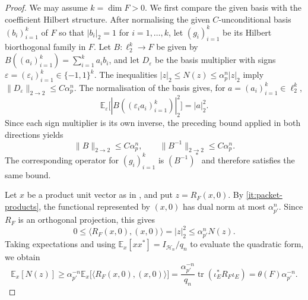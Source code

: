 \documentclass[11pt,a4paper,reqno]{amsart}
\theoremstyle{definition}
\newcommand{\eps}{\varepsilon}
\newcommand{\norm}[1]{\lVert #1\rVert}
\DeclareMathOperator{\tr}{tr}
\numberwithin{equation}{section}
\begin{document}
\begin{proof}
We may assume $k=\dim F>0$. We first compare the given basis with the coefficient Hilbert structure. After normalising the given $C$-unconditional basis $(b_i)_{i=1}^k$ of $F$ so that $|b_i|_2=1$ for $i=1,\ldots,k$, let $(g_i)_{i=1}^k$ be its Hilbert biorthogonal family in $F$. Let $B\colon\ell_2^k\to F$ be given by $B((a_i)_{i=1}^k)=\sum_{i=1}^k a_i b_i$, and let $D_\eps$ be the basis multiplier with signs $\eps=(\eps_i)_{i=1}^k\in\{-1,1\}^k$. The inequalities $|z|_2\leq N(z)\leq \alpha_p^n|z|_2$ imply $\norm{D_\eps}_{2\to2}\leq C\alpha_p^n$. The normalisation of the basis gives, for $a=(a_i)_{i=1}^k\in\ell_2^k$,
\begin{equation*}
 \mathbb E_\eps\bigl[|B((\eps_i a_i)_{i=1}^k)|_2^2\bigr]=|a|_2^2.
\end{equation*}
Since each sign multiplier is its own inverse, the preceding bound applied in both directions yields
\begin{equation}\label{eq:synthesis-bounds}
 \norm B_{2\to2}\leq C\alpha_p^n,\qquad \norm{B^{-1}}_{2\to2}\leq C\alpha_p^n.
\end{equation}
The corresponding operator for $(g_i)_{i=1}^k$ is $(B^{-1})^*$ and therefore satisfies the same bound.

Let $x$ be a product unit vector as in , and put $z=R_F(x,0)$. By \ref{it:packet-products}, the functional represented by $(x,0)$ has dual norm at most $\alpha_{p'}^n$. Since $R_F$ is an orthogonal projection, this gives
\begin{equation*}
 0\leq\langle R_F(x,0),(x,0)\rangle=|z|_2^2\leq\alpha_{p'}^nN(z).
\end{equation*}
Taking expectations and using $\mathbb E_x[xx^*]=I_{\mathcal H_n}/q_n$ to evaluate the quadratic form, we obtain
\begin{equation}\label{eq:overlap-lower}
 \mathbb E_x[N(z)]\geq\alpha_{p'}^{-n}
    \mathbb E_x\bigl[\langle R_F(x,0),(x,0)\rangle\bigr]
 =\frac{\alpha_{p'}^{-n}}{q_n}\tr(\iota_E^*R_F\iota_E)
 =\theta(F)\alpha_{p'}^{-n}.
\end{equation}


\end{proof}
\end{document}
